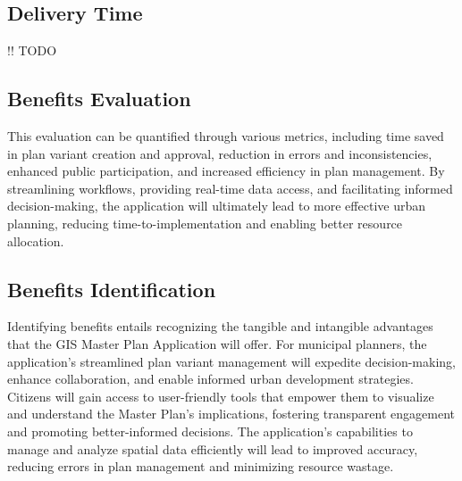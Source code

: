 \subsection{Delivery Time}\label{subsec:delivery-time}
!! TODO

\subsection{Benefits Evaluation}\label{subsec:benefits-evaluation}
This evaluation can be quantified through various metrics, including time saved in plan variant creation and approval, reduction in errors and inconsistencies, enhanced public participation, and increased efficiency in plan management. 
By streamlining workflows, providing real-time data access, and facilitating informed decision-making, the application will ultimately lead to more effective urban planning, reducing time-to-implementation and enabling better resource allocation.

\subsection{Benefits Identification}\label{subsec:benefits-identification}
Identifying benefits entails recognizing the tangible and intangible advantages that the GIS Master Plan Application will offer. For municipal planners, the application's streamlined plan variant management will expedite decision-making, enhance collaboration, and enable informed urban development strategies. Citizens will gain access to user-friendly tools that empower them to visualize and understand the Master Plan's implications, fostering transparent engagement and promoting better-informed decisions.
The application's capabilities to manage and analyze spatial data efficiently will lead to improved accuracy, reducing errors in plan management and minimizing resource wastage.


